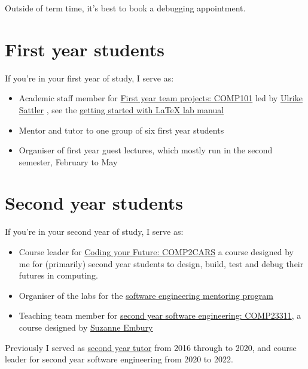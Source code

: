 \documentclass[
  12pt,
]{book}
\providecommand{\tightlist}{%
  \setlength{\itemsep}{0pt}\setlength{\parskip}{0pt}}
\begin{document}
Outside of term time, it's best to book a debugging appointment. 🐛

\hypertarget{year1}{%
\section{First year students}\label{year1}}

If you're in your first year of study, I serve as:

\begin{itemize}
\tightlist
\item
  Academic staff member for \href{https://studentnet.cs.manchester.ac.uk/ugt/COMP10120/syllabus/}{First year team projects: COMP101} led by \href{http://www.cs.man.ac.uk/~sattler/}{Ulrike Sattler} \citep{COMP10120}, see the \href{http://latex4year1.netlify.app}{getting started with LaTeX lab manual}
\item
  Mentor and tutor to one group of six first year students
\item
  Organiser of first year guest lectures, which mostly run in the second semester, February to May
\end{itemize}

\hypertarget{year2}{%
\section{Second year students}\label{year2}}

If you're in your second year of study, I serve as:

\begin{itemize}
\tightlist
\item
  Course leader for \href{https://www.cdyf.me/}{Coding your Future: COMP2CARS} a course designed by me for (primarily) second year students to design, build, test and debug their futures in computing.
\item
  Organiser of the labs for the \href{https://www.cs.manchester.ac.uk/connect/business-engagement/industrial-mentoring/}{software engineering mentoring program}
\item
  Teaching team member for \href{https://studentnet.cs.manchester.ac.uk/ugt/COMP23311/syllabus/}{second year software engineering: COMP23311}, a course designed by \href{http://www.cs.man.ac.uk/~embury/}{Suzanne Embury} \citep{COMP23311, git}
\end{itemize}

Previously I served as \href{https://studentnet.cs.manchester.ac.uk/ugt/year2/}{second year tutor} from 2016 through to 2020, and course leader for second year software engineering from 2020 to 2022.
\end{document}
